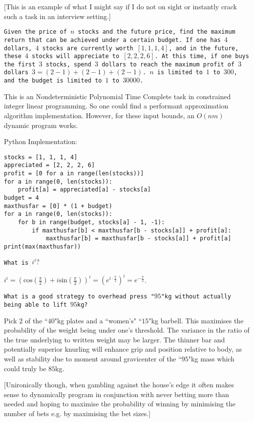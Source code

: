 [This is an example of what I might say if I do not on sight or instantly crack such a task in an interview setting.]

\texttt{Given the price of $n$ stocks and the future price, find the maximum return that can be achieved under a certain budget. If one has $4$ dollars, $4$ stocks are currently worth $[1,1,1,4]$, and in the future, these $4$ stocks will appreciate to $[2,2,2,6]$. At this time, if one buys the first $3$ stocks, spend $3$ dollars to reach the maximum profit of $3$ dollars $3=(2-1)+(2-1)+(2-1)$. $n$ is limited to $1$ to $300$, and the budget is limited to $1$ to $30000$.}

This is an Nondeterministic Polynomial Time Complete task in constrained integer linear programming. So one could find a performant approximation algorithm implementation. However, for these input bounds, an $O(nm)$ dynamic program works.

Python Implementation:

\begin{verbatim}
stocks = [1, 1, 1, 4]
appreciated = [2, 2, 2, 6]
profit = [0 for a in range(len(stocks))]
for a in range(0, len(stocks)):
    profit[a] = appreciated[a] - stocks[a]
budget = 4
maxthusfar = [0] * (1 + budget)
for a in range(0, len(stocks)):
    for b in range(budget, stocks[a] - 1, -1):
        if maxthusfar[b] < maxthusfar[b - stocks[a]] + profit[a]:
            maxthusfar[b] = maxthusfar[b - stocks[a]] + profit[a]
print(max(maxthusfar))
\end{verbatim}

\texttt{What is $i^i?$}

$i^i = \left ( \text{cos}\left( \frac{\pi}{2} \right)+i \text{sin}\left( \frac{\pi}{2} \right) \right )^i = \left ( e^{i \cdot \frac{\pi}{2}} \right )^i = \boxed{e^{-\frac{\pi}{2}}}$.

\texttt{What is a good strategy to overhead press "$95$"kg without actually being able to lift $95$kg?}

Pick $2$ of the ``$40$"kg plates and a ``women's" ``$15$"kg barbell. This maximises the probability of the weight being under one's threshold. The variance in the ratio of the true underlying to written weight may be larger. The thinner bar and potentially superior knurling will enhance grip and position relative to body, as well as stability due to moment around gravicenter of the ``$95$"kg mass which could truly be $85$kg.

[Unironically though, when gambling against the house's edge it often makes sense to dynamically program in conjunction with never betting more than needed and hoping to maximise the probability of winning by minimising the number of bets e.g. by maximising the bet sizes.]

